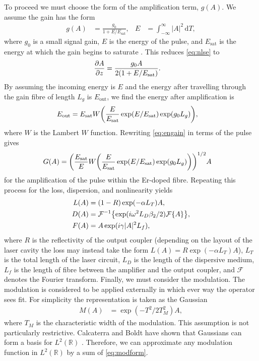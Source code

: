 \documentclass[9pt,twocolumn,twoside]{osajnl}
\let\originalleft\left
\let\originalright\right
\renewcommand{\left}{\mathopen{}\mathclose\bgroup\originalleft}
\renewcommand{\right}{\aftergroup\egroup\originalright}
\providecommand{\df}{\textrm{d}} %
\newcommand{\pdiff}[3][\hspace{-0.5pt}]{\frac{\partial^{#1}#2}{\partial{#3}^{#1}}} %
\newcommand{\Es}{E_{\textrm{sat}}} %
\newcommand{\FT}[1]{\mathcal{F}\left\{ #1 \right\}} %
\newcommand{\FTi}[1]{\mathcal{F}^{-1}\left\{ #1 \right\}} %
\begin{document}
To proceed we must choose the form of the amplification term, $g(A)$. We assume the gain has the form
\begin{align}
	g(A) &= \frac{g_0}{1 + E / \Es},& E &= \int_{-\infty}^\infty |A|^2 \, \df T,
	\label{eq:energy}
\end{align}
where $g_0$ is a small signal gain, $E$ is the energy of the pulse, and $\Es$ is the energy at which the gain begins to saturate \cite{haus1984, shtyrina2017, silfvast2004}. This reduces \eqref{eq:nlse} to
\begin{align}
	\pdiff{A}{z} &= \frac{g_0 A}{2 \left( 1 + E / \Es \right)}.
\end{align}
By assuming the incoming energy is $E$ and the energy after travelling through the gain fibre of length $L_g$ is $E_{\text{out}}$, we find the energy after amplification is
\begin{align}
	\label{eq:engain}
	E_{\text{out}} &= \Es W \left( \frac{E}{\Es} \exp( E / \Es ) \exp( g_0 L_g ) \right),
\end{align}
where $W$ is the Lambert $W$ function. Rewriting \eqref{eq:engain} in terms of the pulse gives
\begin{align}
	G(A) &= \left( \frac{\Es}{E} W \left( \frac{E}{\Es} \exp( E / \Es ) \exp( g_0 L_g ) \right) \right)^{1/2} A
	\label{eq:gainform}
\end{align}
for the amplification of the pulse within the Er-doped fibre. Repeating this process for the loss, dispersion, and nonlinearity yields
\begin{align}
	L(A) &= (1 - R) \exp( - \alpha L_T )A, \\
	D(A) &= \FTi{\exp( i \omega^2 L_D\beta_2/2 ) \FT{A}}, \\
	F(A) &= A \exp( i \gamma |A|^2 L_f ),
\end{align}
where $R$ is the reflectivity of the output coupler (depending on the layout of the laser cavity the loss may instead take the form $L(A) = R \exp( - \alpha L_T )A$), $L_T$ is the total length of the laser circuit, $L_D$ is the length of the dispersive medium, $L_f$ is the length of fibre between the amplifier and the output coupler, and $\mathcal{F}$ denotes the Fourier transform. Finally, we must consider the modulation. The modulation is considered to be applied externally in which ever way the operator sees fit. For simplicity the representation is taken as the Gaussian
\begin{align}
	M(A) &= \exp( -T^2 / 2 T_M^2 ) A,
	\label{eq:modform}
\end{align}
where $T_M$ is the characteristic width of the modulation. This assumption is not particularly restrictive. Calcaterra and Boldt have shown that Gaussians can form a basis for $L^2(\mathbb{R})$ \cite{calcaterra2008a}. Therefore, we can approximate any modulation function in $L^2(\mathbb{R})$ by a sum of \eqref{eq:modform}.
\end{document}
